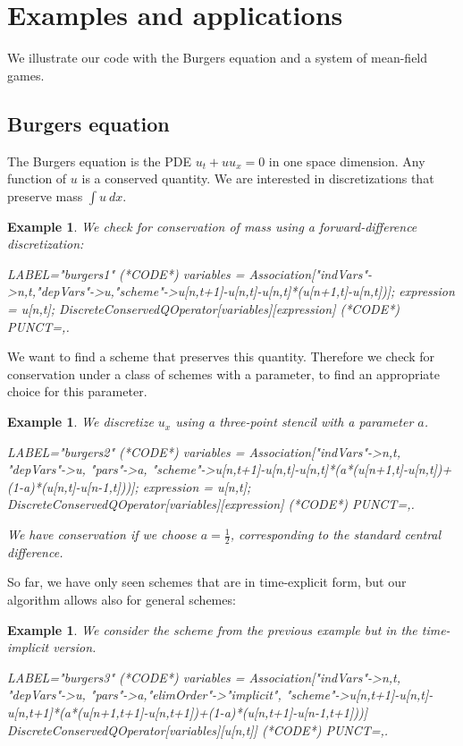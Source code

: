 \documentclass[sigconf,twocolumn]{acmart}
\newcommand{\1}{{\chi}}
\numberwithin{equation}{section}
\theoremstyle{thmlemcorr}
\numberwithin{theorem}{section}
\theoremstyle{thmlemcorr*}
\theoremstyle{defi}
\theoremstyle{remexample}
\newtheorem{example}[theorem]{Example}
\theoremstyle{ass}
\begin{document}
\section{Examples and applications}
\label{eaa}
We illustrate our code with the Burgers equation and a system of mean-field games.
\subsection*{Burgers equation}
The Burgers equation is the PDE $u_t+uu_x=0$ \cite{smoller94} in one space dimension. Any function of $u$ is a conserved quantity. We are interested in discretizations that preserve mass $\int u\ dx$.
\begin{example}
	We check for conservation of mass using a forward-difference discretization:
	\begin{EXE}
		LABEL="burgers1"
		(*CODE*)
		variables = Association["indVars"->{n,t},"depVars"->{u},"scheme"->{u[n,t+1]-u[n,t]-u[n,t]*(u[n+1,t]-u[n,t])}];
		expression = u[n,t];
		DiscreteConservedQOperator[variables][expression]
		(*CODE*)
		PUNCT={,.}
	\end{EXE}
	\begin{small}
		
		
	\end{small}
\end{example}
We want to find a scheme that preserves this quantity. Therefore we check for conservation under a class of schemes with a parameter, to find an appropriate choice for this parameter.
\begin{example}
	We discretize $u_x$ using a three-point stencil with a parameter $a$.
	\begin{EXE}
		LABEL="burgers2"
		(*CODE*)
		variables = Association["indVars"->{n,t}, "depVars"->{u}, "pars"->{a}, "scheme"->{u[n,t+1]-u[n,t]-u[n,t]*(a*(u[n+1,t]-u[n,t])+(1-a)*(u[n,t]-u[n-1,t]))}];
		expression = u[n,t];
		DiscreteConservedQOperator[variables][expression]
		(*CODE*)
		PUNCT={,.}
	\end{EXE}
	\begin{small}
		
		
	\end{small}
	We have conservation if we choose $a=\frac{1}{2}$, corresponding to the standard central difference.
\end{example}
So far, we have only seen schemes that are in time-explicit form, but our algorithm allows also for general schemes:
\begin{example}
	We consider the scheme from the previous example but in the time-implicit version.
	\begin{EXE}
		LABEL="burgers3"
		(*CODE*)
		variables = Association["indVars"->{n,t}, "depVars"->{u}, "pars"->{a},"elimOrder"->"implicit", "scheme"->{u[n,t+1]-u[n,t]-u[n,t+1]*(a*(u[n+1,t+1]-u[n,t+1])+(1-a)*(u[n,t+1]-u[n-1,t+1]))}]
		DiscreteConservedQOperator[variables][u[n,t]]
		(*CODE*)
		PUNCT={,.}
	\end{EXE}
	\begin{small}
		
		
	\end{small}
\end{example}
\end{document}
